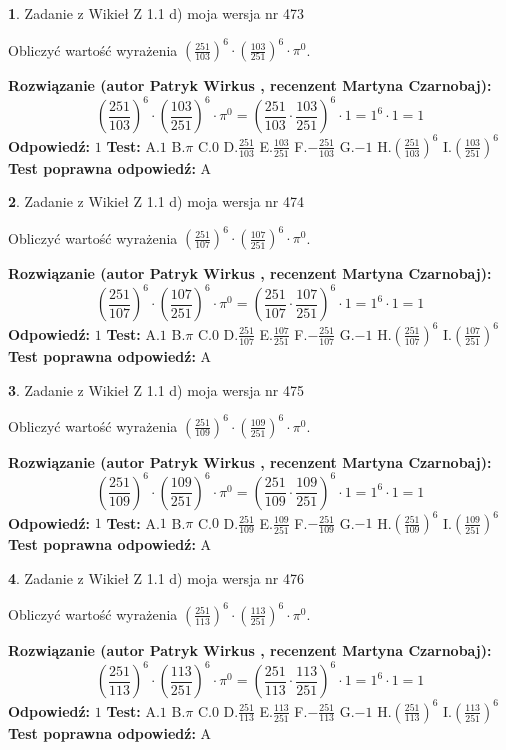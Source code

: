 \documentclass[12pt, a4paper]{article}
\theoremstyle{definition} %
\newtheorem{zad}{}
\newcommand{\zadStart}[1]{\begin{zad}#1\newline}
\newcommand{\zadStop}{\end{zad}}
\newcommand{\rozwStart}[2]{\noindent \textbf{Rozwiązanie (autor #1 , recenzent #2): }\newline}
\newcommand{\rozwStop}{\newline}
\newcommand{\odpStart}{\noindent \textbf{Odpowiedź:}\newline}
\newcommand{\odpStop}{\newline}
\newcommand{\testStart}{\noindent \textbf{Test:}\newline}
\newcommand{\testStop}{\newline}
\newcommand{\kluczStart}{\noindent \textbf{Test poprawna odpowiedź:}\newline}
\newcommand{\kluczStop}{\newline}
\begin{document}
\zadStart{Zadanie z Wikieł Z 1.1 d) moja wersja nr 473}

Obliczyć wartość wyrażenia $(\frac{251}{103})^{6} \cdot (\frac{103}{251})^{6} \cdot \pi^{0}$.
\zadStop
\rozwStart{Patryk Wirkus}{Martyna Czarnobaj}
$$(\frac{251}{103})^{6} \cdot (\frac{103}{251})^{6} \cdot \pi^{0} = (\frac{251}{103} \cdot \frac{103}{251})^{6} \cdot 1 = 1^{6} \cdot 1 = 1$$
\rozwStop
\odpStart
$1$
\odpStop
\testStart
A.$1$ B.$\pi$ C.$0$ D.$\frac{251}{103}$ E.$\frac{103}{251}$
F.$-\frac{251}{103}$ G.$-1$
H.$(\frac{251}{103})^{6}$
I.$(\frac{103}{251})^{6}$
\testStop
\kluczStart
A
\kluczStop



\zadStart{Zadanie z Wikieł Z 1.1 d) moja wersja nr 474}

Obliczyć wartość wyrażenia $(\frac{251}{107})^{6} \cdot (\frac{107}{251})^{6} \cdot \pi^{0}$.
\zadStop
\rozwStart{Patryk Wirkus}{Martyna Czarnobaj}
$$(\frac{251}{107})^{6} \cdot (\frac{107}{251})^{6} \cdot \pi^{0} = (\frac{251}{107} \cdot \frac{107}{251})^{6} \cdot 1 = 1^{6} \cdot 1 = 1$$
\rozwStop
\odpStart
$1$
\odpStop
\testStart
A.$1$ B.$\pi$ C.$0$ D.$\frac{251}{107}$ E.$\frac{107}{251}$
F.$-\frac{251}{107}$ G.$-1$
H.$(\frac{251}{107})^{6}$
I.$(\frac{107}{251})^{6}$
\testStop
\kluczStart
A
\kluczStop



\zadStart{Zadanie z Wikieł Z 1.1 d) moja wersja nr 475}

Obliczyć wartość wyrażenia $(\frac{251}{109})^{6} \cdot (\frac{109}{251})^{6} \cdot \pi^{0}$.
\zadStop
\rozwStart{Patryk Wirkus}{Martyna Czarnobaj}
$$(\frac{251}{109})^{6} \cdot (\frac{109}{251})^{6} \cdot \pi^{0} = (\frac{251}{109} \cdot \frac{109}{251})^{6} \cdot 1 = 1^{6} \cdot 1 = 1$$
\rozwStop
\odpStart
$1$
\odpStop
\testStart
A.$1$ B.$\pi$ C.$0$ D.$\frac{251}{109}$ E.$\frac{109}{251}$
F.$-\frac{251}{109}$ G.$-1$
H.$(\frac{251}{109})^{6}$
I.$(\frac{109}{251})^{6}$
\testStop
\kluczStart
A
\kluczStop



\zadStart{Zadanie z Wikieł Z 1.1 d) moja wersja nr 476}

Obliczyć wartość wyrażenia $(\frac{251}{113})^{6} \cdot (\frac{113}{251})^{6} \cdot \pi^{0}$.
\zadStop
\rozwStart{Patryk Wirkus}{Martyna Czarnobaj}
$$(\frac{251}{113})^{6} \cdot (\frac{113}{251})^{6} \cdot \pi^{0} = (\frac{251}{113} \cdot \frac{113}{251})^{6} \cdot 1 = 1^{6} \cdot 1 = 1$$
\rozwStop
\odpStart
$1$
\odpStop
\testStart
A.$1$ B.$\pi$ C.$0$ D.$\frac{251}{113}$ E.$\frac{113}{251}$
F.$-\frac{251}{113}$ G.$-1$
H.$(\frac{251}{113})^{6}$
I.$(\frac{113}{251})^{6}$
\testStop
\kluczStart
A
\kluczStop
\end{document}
